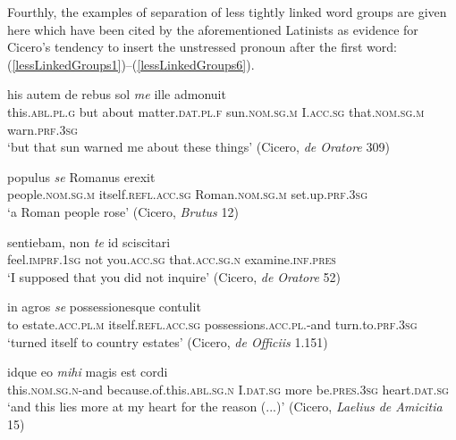Fourthly, the examples of separation of less tightly linked word groups are given here which have been cited by the aforementioned Latinists as evidence for Cicero's tendency to insert the unstressed pronoun after the first word: (\ref{lessLinkedGroups1})--(\ref{lessLinkedGroups6}).

\begin{exe}
\ex
\gll his autem de rebus sol \emph{me} ille admonuit\\
this.\textsc{abl.pl.g} but about matter.\textsc{dat.pl.f} sun.\textsc{nom.sg.m} I.\textsc{acc.sg} that.\textsc{nom.sg.m} warn.\textsc{prf.3sg}\\
\trans `but that sun warned me about these things' (Cicero, \textit{de Oratore} 309)
\label{lessLinkedGroups1}
\end{exe}

\begin{exe}
\ex
\gll populus \emph{se} Romanus erexit\\
people.\textsc{nom.sg.m} itself.\textsc{refl.acc.sg} Roman.\textsc{nom.sg.m} set.up.\textsc{prf.3sg}\\
\trans `a Roman people rose' (Cicero, \textit{Brutus} 12)
\label{lessLinkedGroups2}
\end{exe}%

\begin{exe}
\ex
\gll sentiebam, non \emph{te} id sciscitari\\
feel.\textsc{imprf.1sg} not you.\textsc{acc.sg} that.\textsc{acc.sg.n} examine.\textsc{inf.pres}\\
\trans `I supposed that you did not inquire' (Cicero, \textit{de Oratore} 52)
\label{lessLinkedGroups3}
\end{exe}

\begin{exe}
\ex
\gll in agros \emph{se} possessionesque contulit\\
to estate.\textsc{acc.pl.m} itself.\textsc{refl.acc.sg} possessions.\textsc{acc.pl.}-and turn.to.\textsc{prf.3sg}\\
\trans `turned itself to country estates' (Cicero, \textit{de Officiis} 1.151)
\label{lessLinkedGroups4}
\end{exe}%

\begin{exe}
\ex
\gll idque eo \emph{mihi} magis est cordi\\
this.\textsc{nom.sg.n}-and because.of.this.\textsc{abl.sg.n} I.\textsc{dat.sg} more be.\textsc{pres.3sg} heart.\textsc{dat.sg}\\
\trans `and this lies more at my heart for the reason (...)' (Cicero, \textit{Laelius de Amicitia} 15)
\label{lessLinkedGroups5}
\end{exe}

